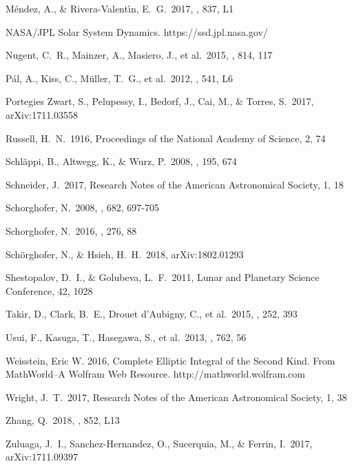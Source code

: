 \documentclass[a4paper,fleqn,usenatbib]{mnras}
\begin{document}
\begin{thebibliography}{99}
 M{\'e}ndez, A., \& Rivera-Valent{\'{\i}}n, E.~G.\ 2017, \apjl, 837, L1 

 NASA/JPL Solar System Dynamics. https://ssd.jpl.nasa.gov/

 Nugent, C.~R., Mainzer, A., Masiero, J., et al.\ 2015, \apj, 814, 117 

 P{\'a}l, A., Kiss, C., M{\"u}ller, T.~G., et al.\ 2012, \aap, 541, L6 

 Portegies Zwart, S., Pelupessy, I., Bedorf, J., Cai, M., \& Torres, S.\ 2017, arXiv:1711.03558

 Russell, H.~N.\ 1916, Proceedings of the National Academy of Science, 2, 74 

 Schl{\"a}ppi, B., Altwegg, K., \& Wurz, P.\ 2008, \icarus, 195, 674 

 Schneider, J.\ 2017, Research Notes of the American Astronomical Society, 1, 18

 Schorghofer, N.\ 2008, \apj, 682, 697-705 

 Schorghofer, N.\ 2016, \icarus, 276, 88

 Sch{\"o}rghofer, N., \& Hsieh, H.~H.\ 2018, arXiv:1802.01293

 Shestopalov, D.~I., \& Golubeva, L.~F.\ 2011, Lunar and Planetary Science Conference, 42, 1028

 Takir, D., Clark, B.~E., Drouet d'Aubigny, C., et al.\ 2015, \icarus, 252, 393 

 Usui, F., Kasuga, T., Hasegawa, S., et al.\ 2013, \apj, 762, 56 

 Weisstein, Eric W. 2016, Complete Elliptic Integral of the Second Kind. From MathWorld--A Wolfram Web Resource. http://mathworld.wolfram.com

 Wright, J.~T.\ 2017, Research Notes of the American Astronomical Society, 1, 38 

 Zhang, Q.\ 2018, \apjl, 852, L13

 Zuluaga, J.~I., Sanchez-Hernandez, O., Sucerquia, M., \& Ferrin, I.\ 2017, arXiv:1711.09397

\end{thebibliography}


\bsp	%
\label{lastpage}
\end{document}
